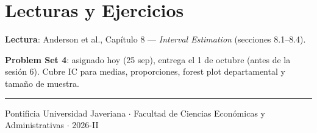 \documentclass[11pt, a4paper]{article}
\begin{document}
\section{Lecturas y Ejercicios}

\textbf{Lectura}: Anderson et al., Cap\'itulo 8 --- \textit{Interval Estimation} (secciones 8.1--8.4).

\textbf{Problem Set 4}: asignado hoy (25 sep), entrega el 1 de octubre (antes de la sesi\'on 6). Cubre IC para medias, proporciones, forest plot departamental y tama\~no de muestra.

\vspace{12pt}
\rule{\linewidth}{0.4pt}
\begin{center}
{\small Pontificia Universidad Javeriana $\cdot$
  Facultad de Ciencias Econ\'omicas y Administrativas $\cdot$ 2026-II}
\end{center}
\end{document}
